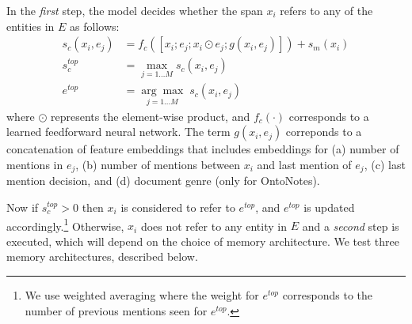 \documentclass[11pt,a4paper]{article}
\begin{document}
In the \emph{first} step, the model decides whether the span $x_i$ refers to any of the entities in $E$ as follows:
\begin{align*}
s_c(x_i, e_j) &\!=\! f_c([x_i; e_j; x_i \odot e_j; g(x_i, e_j)]) \!+\! s_m(x_i)\\
s_c^{\mathit{top}} &\!=\! \max_{j=1 \dotsc M} s_c(x_i, e_j)\\
e^{\mathit{top}} &\!=\! \underset{{j=1 \dotsc M}}{\arg\max}\; s_c(x_i, e_j)
\end{align*} where $\odot$ represents the element-wise product, and $f_c(\cdot)$ corresponds to a learned feedforward neural network.
The term $g(x_i, e_j)$ correponds to a concatenation of feature embeddings that includes embeddings for (a) number of mentions in $e_j$, (b) number of mentions between $x_i$ and last mention of $e_j$, (c) last mention decision, and (d) document genre (only for OntoNotes). 

Now if $s_c^{\mathit{top}} > 0$ then $x_i$ is considered to refer to $e^{\mathit{top}}$, and $e^{\mathit{top}}$ is updated accordingly.\footnote{We use weighted averaging where the weight for $e^{\mathit{top}}$ corresponds to the number of previous mentions seen for  $e^{\mathit{top}}$.}
Otherwise, $x_i$ does not refer to any entity in $E$ and a \emph{second} step is executed, which will depend on the choice of memory architecture.
We test three
 memory architectures, described below.
\end{document}
